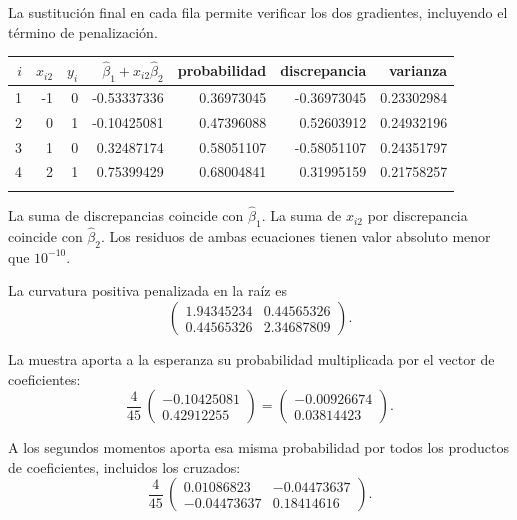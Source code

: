 \documentclass[11pt,a4paper]{article}
\begin{document}
La sustitución final en cada fila permite verificar
los dos gradientes, incluyendo el término de penalización.
\begin{center}\scriptsize
\begin{tabular}{rrrrrrr}\toprule
\(i\)&\(x_{i2}\)&\(y_i\)&\(\widehat\beta_1+x_{i2}\widehat\beta_2\)&probabilidad&discrepancia&varianza\\\midrule
1&-1&0&-0.53337336&0.36973045&-0.36973045&0.23302984\\
2&0&1&-0.10425081&0.47396088&0.52603912&0.24932196\\
3&1&0&0.32487174&0.58051107&-0.58051107&0.24351797\\
4&2&1&0.75399429&0.68004841&0.31995159&0.21758257\\
\\\bottomrule\end{tabular}\end{center}
La suma de discrepancias coincide con \(\widehat\beta_1\).
La suma de \(x_{i2}\) por discrepancia coincide con
\(\widehat\beta_2\). Los residuos de ambas ecuaciones
tienen valor absoluto menor que \(10^{-10}\).

La curvatura positiva penalizada en la raíz es
\[
\begin{pmatrix}1.94345234&0.44565326\\0.44565326&2.34687809\end{pmatrix}.
\]

La muestra aporta a la esperanza su probabilidad
multiplicada por el vector de coeficientes:
\[
\frac{4}{45}\,\begin{pmatrix}-0.10425081\\0.42912255\end{pmatrix}=\begin{pmatrix}-0.00926674\\0.03814423\end{pmatrix}.
\]

A los segundos momentos aporta esa misma probabilidad
por todos los productos de coeficientes, incluidos los cruzados:
\[
\frac{4}{45}\,\begin{pmatrix}0.01086823&-0.04473637\\-0.04473637&0.18414616\end{pmatrix}.
\]
\end{document}
